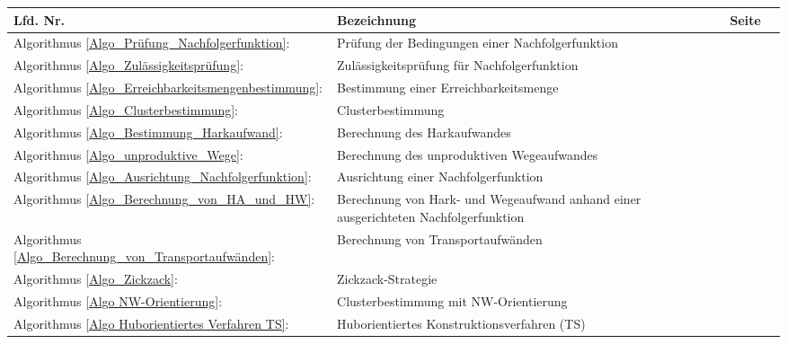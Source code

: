 \begin{tabular}{lp{10cm}cm{2cm}}
\textbf{Lfd. Nr.} & \textbf{Bezeichnung} & \textbf{Seite}\\
\hline
Algorithmus \ref{Algo_Prüfung_Nachfolgerfunktion}: 
& Prüfung der Bedingungen einer Nachfolgerfunktion 
& \pageref{Algo_Prüfung_Nachfolgerfunktion}\\

Algorithmus \ref{Algo_Zulässigkeitsprüfung}: 
& Zulässigkeitsprüfung für Nachfolgerfunktion 
& \pageref{Algo_Zulässigkeitsprüfung}\\

Algorithmus \ref{Algo_Erreichbarkeitsmengenbestimmung}: 
& Bestimmung einer Erreichbarkeitsmenge 
& \pageref{Algo_Erreichbarkeitsmengenbestimmung}\\

Algorithmus \ref{Algo_Clusterbestimmung}: 
& Clusterbestimmung 
& \pageref{Algo_Clusterbestimmung}\\

Algorithmus \ref{Algo_Bestimmung_Harkaufwand}: 
& Berechnung des Harkaufwandes 
& \pageref{Algo_Bestimmung_Harkaufwand}\\

Algorithmus \ref{Algo_unproduktive_Wege}: 
& Berechnung des unproduktiven Wegeaufwandes 
& \pageref{Algo_unproduktive_Wege}\\

Algorithmus \ref{Algo_Ausrichtung_Nachfolgerfunktion}: 
& Ausrichtung einer Nachfolgerfunktion 
& \pageref{Algo_Ausrichtung_Nachfolgerfunktion}\\

Algorithmus \ref{Algo_Berechnung_von_HA_und_HW}: 
& Berechnung von Hark- und Wegeaufwand anhand einer ausgerichteten Nachfolgerfunktion 
& \pageref{Algo_Berechnung_von_HA_und_HW}\\

Algorithmus \ref{Algo_Berechnung_von_Transportaufwänden}: 
& Berechnung von Transportaufwänden 
& \pageref{Algo_Berechnung_von_Transportaufwänden}\\

Algorithmus \ref{Algo_Zickzack}: 
& Zickzack-Strategie
& \pageref{Algo_Zickzack}\\

Algorithmus \ref{Algo NW-Orientierung}: 
& Clusterbestimmung mit NW-Orientierung
& \pageref{Algo NW-Orientierung}\\

Algorithmus \ref{Algo Huborientiertes Verfahren TS}: 
& Huborientiertes Konstruktionsverfahren (TS)
& \pageref{Algo Huborientiertes Verfahren TS}\\


\end{tabular}
